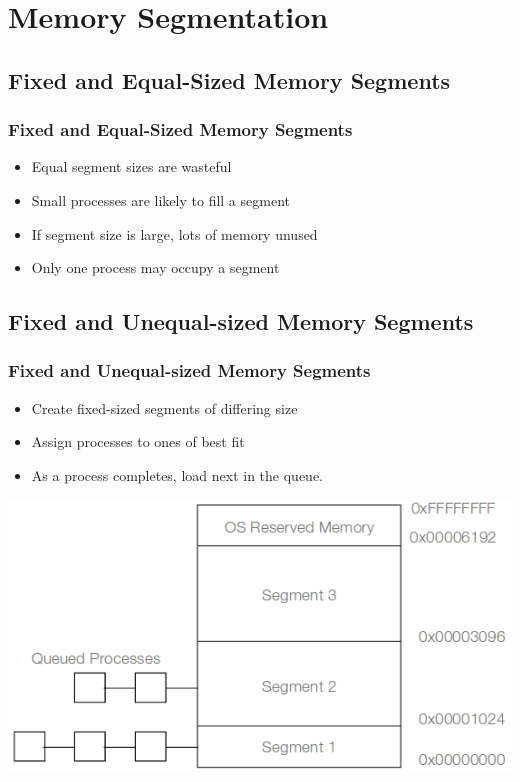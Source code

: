 \documentclass{beamer}
\begin{document}
\section{Memory Segmentation}
\subsection{Fixed and Equal-Sized Memory Segments}
\begin{frame}
\frametitle{Fixed and Equal-Sized Memory Segments}
\begin{itemize}
\item Equal segment sizes are wasteful
\item Small processes are likely to fill a segment
\item If segment size is large, lots of memory unused
\item Only one process may occupy a segment
\end{itemize}
\end{frame}
\subsection{Fixed and Unequal-sized Memory Segments}
\begin{frame}
\frametitle{Fixed and Unequal-sized Memory Segments}
\begin{itemize}
\item Create fixed-sized segments of differing size
\item Assign processes to ones of best fit
\item As a process completes, load next in the queue.
\end{itemize}
\includegraphics[scale=0.35]{uneq.png}
\end{frame}
\end{document}

